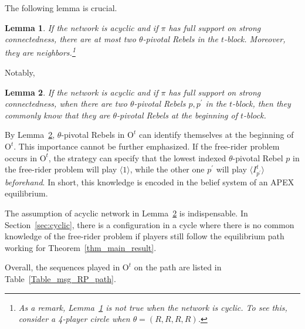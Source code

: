 \documentclass[12pt,letter]{article}
\newcommand{\Omicron}{\mathrm{O}}
\newtheorem{lemma}{Lemma}[section]
\theoremstyle{definition}
\theoremstyle{remark}
\theoremstyle{claim}
\begin{document}
The following lemma is crucial. 
\begin{lemma}
\label{lemma_at_most_two_nodes}
If the network is acyclic and if $\pi$ has full support on strong connectedness, there are at most two $\theta$-pivotal Rebels in the $t$-block. Moreover, they are neighbors.\footnote{As a remark, Lemma~\ref{lemma_at_most_two_nodes} is not true when the network is cyclic. To see this, consider a 4-player circle when $\theta=(R,R,R,R)$.}
\end{lemma}

Notably,

\begin{lemma}
\label{lemman_pivotals_CK}
If the network is acyclic and if $\pi$ has full support on strong connectedness, when there are two $\theta$-pivotal Rebels $p,p^{'}$ in the $t$-block, then they commonly know that they are $\theta$-pivotal Rebels at the beginning of $t$-block.
\end{lemma}

By Lemma~\ref{lemman_pivotals_CK}, $\theta$-pivotal Rebels in $\Omicron^t$ can identify themselves at the beginning of $\Omicron^t$. This importance cannot be further emphasized. If the free-rider problem occurs in $\Omicron^t$, the strategy can specify that the lowest indexed $\theta$-pivotal Rebel $p$ in the free-rider problem will play $\langle 1 \rangle$, while the other one $p^{'}$ will play $\langle I^t_{p^{'}} \rangle$ \textit{beforehand}. In short, this knowledge is encoded in the belief system of an APEX equilibrium.

The assumption of acyclic network in Lemma~\ref{lemman_pivotals_CK} is indispensable. In Section~\ref{sec:cyclic}, there is a configuration in a cycle where there is no common knowledge of the free-rider problem if players still follow the equilibrium path working for Theorem~\ref{thm_main_result}. 

Overall, the sequences played in $\Omicron^t$ on the path are listed in Table~\ref{Table_msg_RP_path}.
\end{document}
